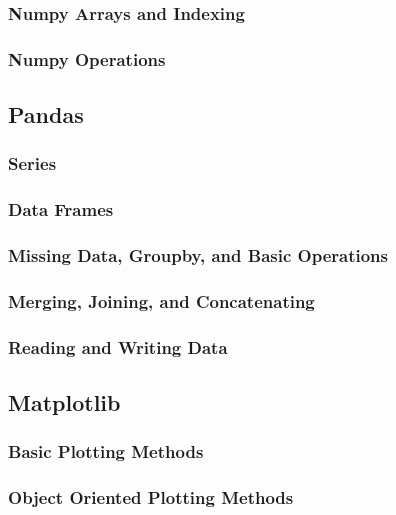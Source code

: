 \documentclass[11pt]{article}
\theoremstyle{plain}
\theoremstyle{definition}
\begin{document}
\subsubsection{Numpy Arrays and Indexing}

\subsubsection{Numpy Operations}

\vspace{1cm}

\subsection{Pandas}

\subsubsection{Series}

\subsubsection{Data Frames}

\subsubsection{Missing Data, Groupby, and Basic Operations}

\subsubsection{Merging, Joining, and Concatenating}

\subsubsection{Reading and Writing Data}

\vspace{1cm}

\subsection{Matplotlib}

\subsubsection{Basic Plotting Methods}

\subsubsection{Object Oriented Plotting Methods}
\end{document}
